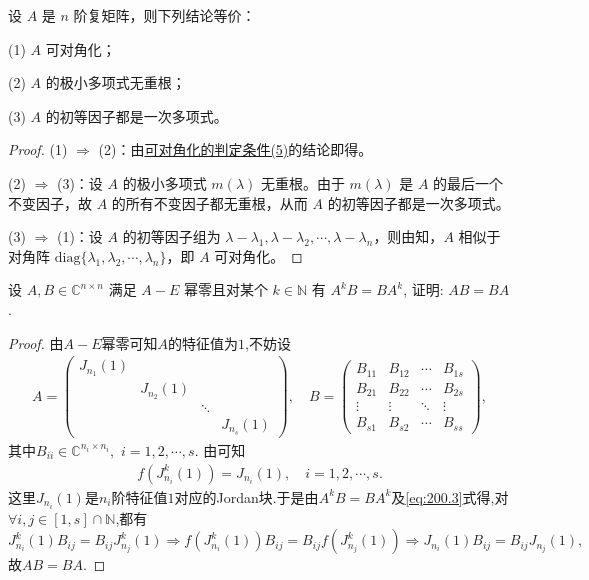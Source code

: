 \documentclass[../../main.tex]{subfiles}%
\begin{document}
\begin{corollary}
设 $A$ 是 $n$ 阶复矩阵，则下列结论等价：

(1) $A$ 可对角化；

(2) $A$ 的极小多项式无重根；

(3) $A$ 的初等因子都是一次多项式。
\end{corollary}
\begin{proof}
(1) $\Rightarrow$ (2)：由\hyperref[theorem:可对角化的判定条件]{可对角化的判定条件(5)}的结论即得。

(2) $\Rightarrow$ (3)：设 $A$ 的极小多项式 $m(\lambda)$ 无重根。由于 $m(\lambda)$ 是 $A$ 的最后一个不变因子，故 $A$ 的所有不变因子都无重根，从而 $A$ 的初等因子都是一次多项式。

(3) $\Rightarrow$ (1)：设 $A$ 的初等因子组为 $\lambda - \lambda_1,\lambda - \lambda_2,\cdots,\lambda - \lambda_n$，则由知，$A$ 相似于对角阵 $\mathrm{diag}\{\lambda_1,\lambda_2,\cdots,\lambda_n\}$，即 $A$ 可对角化。
\end{proof}

\begin{example}
设 \( A,B \in \mathbb{C}^{n \times n} \) 满足 \( A - E \) 幂零且对某个 \( k \in \mathbb{N} \) 有 \( A^k B = BA^k \), 证明: \( AB = BA \).
\end{example}
\begin{proof}
由$A-E$幂零可知$A$的特征值为$1$,不妨设
\begin{align*}
A=\begin{pmatrix}
J_{n_1}(1)&&&\\
&J_{n_2}(1)&&\\
&&\ddots&\\
&&&J_{n_s}(1)
\end{pmatrix},\quad B=\begin{pmatrix}
B_{11}&B_{12}&\cdots&B_{1s}\\
B_{21}&B_{22}&\cdots&B_{2s}\\
\vdots&\vdots&\ddots&\vdots\\
B_{s1}&B_{s2}&\cdots&B_{ss}
\end{pmatrix},
\end{align*}
其中$B_{ii}\in \mathbb{C} ^{n_i\times n_i},\,\,i=1,2,\cdots ,s.$
由可知
\begin{align}
f\left( J_{n_i}^{k}(1) \right) =J_{n_i}(1),\quad i=1,2,\cdots ,s.
\label{eq:200.3}
\end{align}
这里$J_{n_i}(1)$是$n_i$阶特征值$1$对应的Jordan块.于是由$A^kB=BA^k$及\eqref{eq:200.3}式得,对$\forall i,j\in [1,s] \cap \mathbb{N}$,都有
\[
J_{n_i}^{k}(1) B_{ij}=B_{ij}J_{n_j}^{k}(1) \Longrightarrow f\left( J_{n_i}^{k}(1) \right) B_{ij}=B_{ij}f\left( J_{n_j}^{k}(1) \right) \Longrightarrow J_{n_i}(1) B_{ij}=B_{ij}J_{n_j}(1),
\]
故$AB=BA$.
\end{proof}
\end{document}
